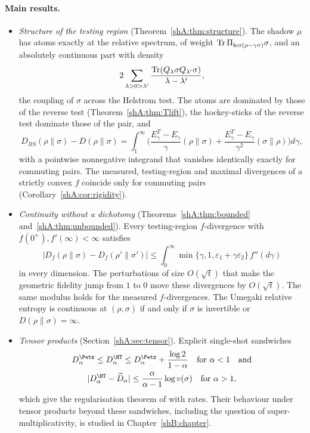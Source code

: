 \paragraph{Main results.}
\begin{itemize}[leftmargin=1.5em]
\item \emph{Structure of the testing region} (Theorem~\ref{shA:thm:structure}). The shadow $\mu$ has atoms exactly at the relative spectrum, of weight $\operatorname{Tr}\Pi_{\ker(\rho-\gamma\sigma)}\sigma$, and an absolutely continuous part with density
\[
2\sum_{\lambda>0>\lambda'}\frac{\operatorname{Tr}(Q_\lambda\sigma Q_{\lambda'}\sigma)}{\lambda-\lambda'},
\]
the coupling of $\sigma$ across the Helstrom test. The atoms are dominated by those of the reverse test (Theorem~\ref{shA:thm:Tlift}), the hockey-sticks of the reverse test dominate those of the pair, and
\[
D_{BS}(\rho\|\sigma)-D(\rho\|\sigma)=\int_1^\infty\Big(\frac{E^T_\gamma-E_\gamma}{\gamma}(\rho\|\sigma)+\frac{E^T_\gamma-E_\gamma}{\gamma^2}(\sigma\|\rho)\Big)d\gamma ,
\]
with a pointwise nonnegative integrand that vanishes identically exactly for commuting pairs. The measured, testing-region and maximal divergences of a strictly convex $f$ coincide only for commuting pairs (Corollary~\ref{shA:cor:rigidity}).
\item \emph{Continuity without a dichotomy} (Theorems~\ref{shA:thm:bounded} and~\ref{shA:thm:unbounded}). Every testing-region $f$-divergence with $f(0^+),f'(\infty)<\infty$ satisfies
\[
|D_f(\rho\|\sigma)-D_f(\rho'\|\sigma')|\le\int_0^\infty\min\{\gamma,1,\varepsilon_1+\gamma\varepsilon_2\}\,f''(d\gamma)
\]
in every dimension. The perturbations of size $O(\sqrt t)$ that make the geometric fidelity jump from $1$ to $0$ move these divergences by $O(\sqrt t)$. The same modulus holds for the measured $f$-divergences. The Umegaki relative entropy is continuous at $(\rho,\sigma)$ if and only if $\sigma$ is invertible or $D(\rho\|\sigma)=\infty$.
\item \emph{Tensor products} (Section~\ref{shA:sec:tensor}). Explicit single-shot sandwiches
\begin{gather*}
D^\Petz_\alpha\le D^\HT_\alpha\le D^\Petz_\alpha+\frac{\log 2}{1-\alpha}\quad\text{for }\alpha<1\quad\text{and}\\
|D^\HT_\alpha-\widetilde D_\alpha|\le\frac{\alpha}{\alpha-1}\log v(\sigma)\quad\text{for }\alpha>1,
\end{gather*}
which give the regularisation theorem of \cite{HircheTomamichel2024} with rates.
Their behaviour under tensor products beyond these sandwiches, including the question of super-multiplicativity, is studied in Chapter~\ref{shB:chapter}.

\end{itemize}
